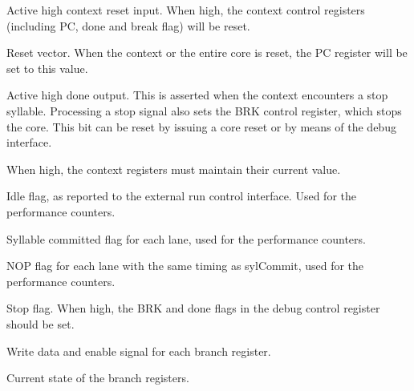 
\interface{}

\ifaceSubGroup{}
Active high context reset input. When high, the context control registers 
(including PC, done and break flag) will be reset.
    
\ifaceSubGroup{}
Reset vector. When the context or the entire core is reset, the PC register will 
be set to this value.
    
\ifaceSubGroup{}
Active high done output. This is asserted when the context encounters a stop 
syllable. Processing a stop signal also sets the BRK control register, which 
stops the core. This bit can be reset by issuing a core reset or by means of the 
debug interface.

\ifaceSubGroup{}
When high, the context registers must maintain their current value.

\ifaceSubGroup{}
Idle flag, as reported to the external run control interface. Used for the 
performance counters.

\ifaceSubGroup{}
Syllable committed flag for each lane, used for the performance counters.
    
\ifaceSubGroup{}
NOP flag for each lane with the same timing as sylCommit, used for the 
performance counters.

\ifaceSubGroup{}
Stop flag. When high, the BRK and done flags in the debug control
register should be set.
    
\ifaceSubGroup{}
Write data and enable signal for each branch register.
    
\ifaceSubGroup{}
Current state of the branch registers.
    
